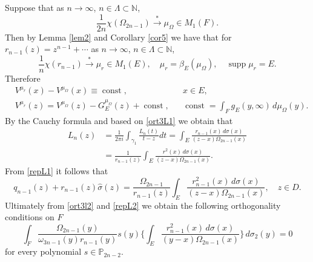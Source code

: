 \documentclass[11pt, a4paper, twoside]{article}
\let\myh\widehat
\def\NN{\mathbb N}
\def\PP{\mathbb P}
\def\supp{\operatorname{supp}}
\def\const{\operatorname{const}}
\theoremstyle{plain}
\theoremstyle{definition}
\begin{document}
Suppose that as $n\to\infty$, $n\in\Lambda \subset\NN$, 
\begin{equation}
\frac1{2n}\chi(\Omega_{2n-1}) \overset{*}\longrightarrow \mu_\Omega\in M_1(F).
\label{limdis1}
\end{equation}
Then by Lemma \ref{lem2} and Corollary \ref{cor5} we have that
for $r_{n-1}(z)=z^{n-1}+\dotsb$ as $n\to\infty$, $n\in\Lambda \subset\NN$, 
\begin{equation}
\frac1n\chi(r_{n-1}){\overset{*}\longrightarrow}\mu_r\in M_1(E),
\quad \mu_r=\beta_E(\mu_\Omega), \quad
\supp{\mu_r}=E.
\label{limdis2}
\end{equation}
Therefore 
\begin{align*}
&V^{\mu_r}(x)-V^{\mu_\Omega}(x)\equiv\const, && x\in E, \\
&V^{\mu_r}(z)=V^{\mu_\Omega}(z)-G_E^{\mu_\Omega}(z)+\const, && \const=\int_F g_E(y,\infty)\,d\mu_\Omega(y).
\end{align*}
By the Cauchy formula and based on \eqref{ort3L1} we obtain that
\begin{align}
L_n(z)&=\frac1{2\pi i} \int_{\gamma_1}
\frac{L_n(t)}{t-z}dt=
\int_E\frac{r_{n-1}(x)\,d\sigma(x)}{(z-x)\Omega_{2n-1}(x)}\nonumber\\
&=\frac1{r_{n-1}(z)}\int_E \frac{r^2(x)\,d\sigma(x)}{(z-x)\Omega_{2n-1}(x)}.\label{repL1}
\end{align}
From \eqref{repL1} it follows that
\begin{equation}
q_{n-1}(z)+r_{n-1}(z)\myh{\sigma}(z)
=\frac{\Omega_{2n-1}}{r_{n-1}(z)}
\int_E \frac{r^2_{n-1}(x)\,d\sigma(x)}{(z-x)\Omega_{2n-1}(x)},\quad z\in D.
\label{repL2}
\end{equation}
Ultimately from \eqref{ort3l2} and  \eqref{repL2} we obtain the following orthogonality conditions on $F$
\begin{equation}
\int_F\frac{\Omega_{2n-1}(y)}{\omega_{3n-1}(y)r_{n-1}(y)}s(y)\biggl\{\int_E\frac{r^2_{n-1}(x)\,d\sigma(x)}{(y-x)\Omega_{2n-1}(x)}\biggr\}\,d\sigma_2(y)=0
\label{ort3l3}
\end{equation}
for every polynomial $s\in\PP_{2n-2}$.
\end{document}
